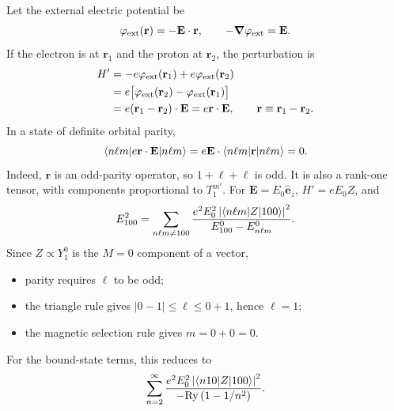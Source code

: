 Let the external electric potential be
\[
 \varphi_{\rm ext}(\mathbf r)=-\mathbf E\cdot\mathbf r,
 \qquad-\boldsymbol\nabla\varphi_{\rm ext}=\mathbf E.
\]
If the electron is at $\mathbf r_1$ and the proton at $\mathbf r_2$,
the perturbation is
\begin{align*}
 H'&=-e\varphi_{\rm ext}(\mathbf r_1)+e\varphi_{\rm ext}(\mathbf r_2)\\
 &=e\bigl[\varphi_{\rm ext}(\mathbf r_2)-\varphi_{\rm ext}(\mathbf r_1)\bigr]\\
 &=e(\mathbf r_1-\mathbf r_2)\cdot\mathbf E
  =e\mathbf r\cdot\mathbf E,
 \qquad\mathbf r\equiv\mathbf r_1-\mathbf r_2.
\end{align*}
In a state of definite orbital parity,
\[
 \langle n\ell m\rvert e\mathbf r\cdot\mathbf E\lvert n\ell m\rangle
 =e\mathbf E\cdot\langle n\ell m\rvert \mathbf r\lvert n\ell m\rangle=0.
\]
Indeed, $\mathbf r$ is an odd-parity operator, so $1+\ell+\ell$ is odd.
It is also a rank-one tensor, with components proportional to $T_1^{m'}$.
For $\mathbf E=E_0\hat{\mathbf e}_z$, $H'=eE_0Z$, and
\[
 E_{100}^2=\sum_{n\ell m\ne100}
 \frac{e^2E_0^2\left\lvert\langle n\ell m\rvert Z\lvert 100\rangle\right\rvert^2}
      {E_{100}^0-E_{n\ell m}^0}.
\]
Since $Z\propto Y_1^0$ is the $M=0$ component of a vector,
\begin{itemize}
 \item parity requires $\ell$ to be odd;
 \item the triangle rule gives $|0-1|\le\ell\le0+1$, hence $\ell=1$;
 \item the magnetic selection rule gives $m=0+0=0$.
\end{itemize}
For the bound-state terms, this reduces to
\[
 \sum_{n=2}^{\infty}
 \frac{e^2E_0^2\left\lvert\langle n10\rvert Z\lvert 100\rangle\right\rvert^2}
      {-\mathrm{Ry}\,(1-1/n^2)}.
\]
